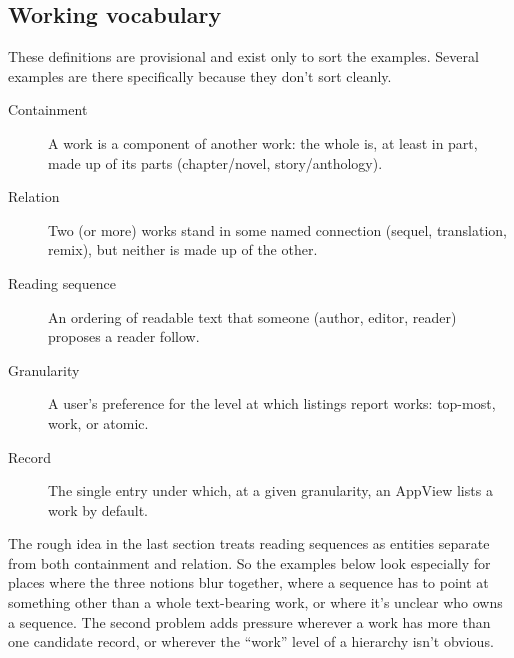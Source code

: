 \documentclass{amsart}
\theoremstyle{remark}
\begin{document}
    \subsection*{Working vocabulary}
    These definitions are provisional and exist only to sort the examples. Several examples are there specifically because they don't sort cleanly.
    \begin{description}
      \item[Containment] A work is a component of another work: the whole is, at least in part, made up of its parts (chapter/novel, story/anthology).
      \item[Relation] Two (or more) works stand in some named connection (sequel, translation, remix), but neither is made up of the other.
      \item[Reading sequence] An ordering of readable text that someone (author, editor, reader) proposes a reader follow.
      \item[Granularity] A user's preference for the level at which listings report works: top-most, work, or atomic.
      \item[Record] The single entry under which, at a given granularity, an AppView lists a work by default.
    \end{description}
    The rough idea in the last section treats reading sequences as entities separate from both containment and relation. So the examples below look especially for places where the three notions blur together, where a sequence has to point at something other than a whole text-bearing work, or where it's unclear who owns a sequence. The second problem adds pressure wherever a work has more than one candidate record, or wherever the ``work'' level of a hierarchy isn't obvious.
\end{document}
